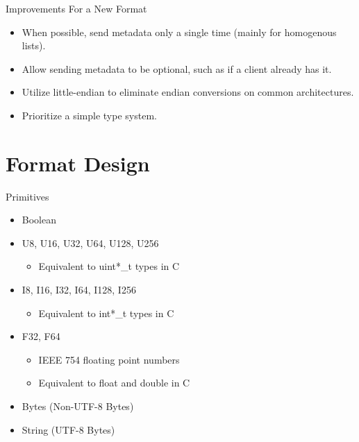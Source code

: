 \documentclass{beamer}
\begin{document}
\begin{frame}{Improvements For a New Format}
	\begin{itemize}
		\item When possible, send metadata only a single time (mainly for homogenous lists).
		\item Allow sending metadata to be optional, such as if a client already has it.
		\item Utilize little-endian to eliminate endian conversions on common architectures.
		\item Prioritize a simple type system.
	\end{itemize}
\end{frame}

\section{Format Design}

\begin{frame}{Primitives}
	\begin{itemize}
		\item Boolean
		\item U8, U16, U32, U64, U128, U256
		      \begin{itemize}
			      \item Equivalent to uint*\_t types in C
		      \end{itemize}
		\item I8, I16, I32, I64, I128, I256
		      \begin{itemize}
			      \item Equivalent to int*\_t types in C
		      \end{itemize}
		\item F32, F64
		      \begin{itemize}
			      \item IEEE 754 floating point numbers
			      \item Equivalent to float and double in C
		      \end{itemize}
		\item Bytes  (Non-UTF-8 Bytes)
		\item String (UTF-8 Bytes)
	\end{itemize}
\end{frame}
\end{document}
